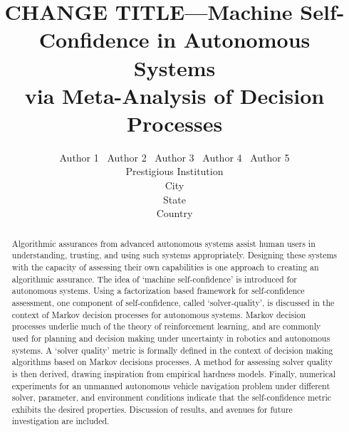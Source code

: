 \documentclass[10pt]{article}
\title{CHANGE TITLE---Machine Self-Confidence in Autonomous Systems \\ via  Meta-Analysis of Decision Processes}%
\author{Author 1 \ Author 2 \ Author 3 \ Author 4 \ Author 5\\ 
        Prestigious Institution\\
        City\\
        State\\
        Country
    }
\begin{document}
\maketitle
\begin{abstract}
    Algorithmic assurances from advanced autonomous systems assist human users in understanding, trusting, and using such systems appropriately. Designing these systems with the capacity of assessing their own capabilities is one approach to creating an algorithmic assurance. The idea of `machine self-confidence' is introduced for autonomous systems. Using a factorization based framework for self-confidence assessment, one component of self-confidence, called `solver-quality', is discussed in the context of Markov decision processes for autonomous systems. Markov decision processes underlie much of the theory of reinforcement learning, and are commonly used for planning and decision making under uncertainty in robotics and autonomous systems. A `solver quality' metric is formally defined in the context of decision making algorithms based on Markov decisions processes. A method for assessing solver quality  is then derived, drawing inspiration from empirical hardness models. Finally, numerical experiments for an unmanned autonomous vehicle navigation problem under different solver, parameter, and environment conditions indicate that the self-confidence metric exhibits the desired properties. Discussion of results, and avenues for future investigation are included.
\end{abstract}







\printbibliography
\end{document}
